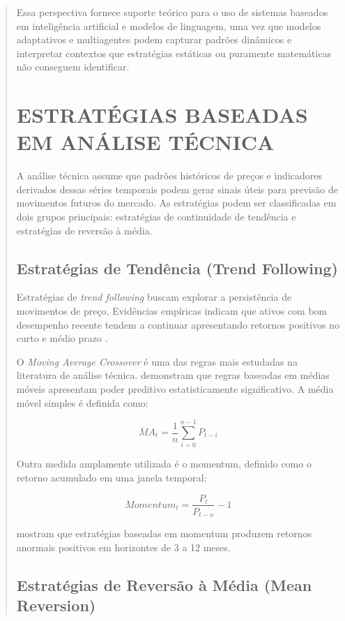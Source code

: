 \documentclass{eic-bcc-tcc}
\begin{document}
\begin{abstract}
Essa perspectiva fornece suporte teórico para o uso de sistemas baseados em inteligência artificial e modelos de linguagem, uma vez que modelos adaptativos e multiagentes podem capturar padrões dinâmicos e interpretar contextos que estratégias estáticas ou puramente matemáticas não conseguem identificar.

\section{ESTRATÉGIAS BASEADAS EM ANÁLISE TÉCNICA}

A análise técnica assume que padrões históricos de preços e indicadores derivados dessas séries temporais podem gerar sinais úteis para previsão de movimentos futuros do mercado. As estratégias podem ser classificadas em dois grupos principais: estratégias de continuidade de tendência e estratégias de reversão à média.

\subsection{Estratégias de Tendência (Trend Following)}

Estratégias de \textit{trend following} buscam explorar a persistência de movimentos de preço. Evidências empíricas indicam que ativos com bom desempenho recente tendem a continuar apresentando retornos positivos no curto e médio prazo \citep{Moskowitz2012}.

O \textit{Moving Average Crossover} é uma das regras mais estudadas na literatura de análise técnica. \citep{Brock1992} demonstram que regras baseadas em médias móveis apresentam poder preditivo estatisticamente significativo. A média móvel simples é definida como:

\begin{equation}
MA_t = \frac{1}{n} \sum_{i=0}^{n-1} P_{t-i}
\end{equation}

Outra medida amplamente utilizada é o momentum, definido como o retorno acumulado em uma janela temporal:

\begin{equation}
Momentum_t = \frac{P_t}{P_{t-n}} - 1
\end{equation}

\citet{JegadeeshTitman1993} mostram que estratégias baseadas em momentum produzem retornos anormais positivos em horizontes de 3 a 12 meses.

\subsection{Estratégias de Reversão à Média (Mean Reversion)}


\end{abstract}
\end{document}
